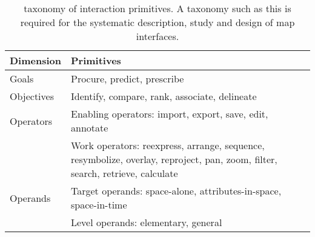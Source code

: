 \begin{table}[H]
	\caption{
		 taxonomy of interaction primitives.
		A taxonomy such as this is required for the systematic description, study and design
		of map interfaces.
	}
	\label{tab:interaction primitives}
	\centering
	\begin{tabular}{ | L{0.15\textwidth} | L{0.75\textwidth} | }
		\hline
		\textbf{Dimension}
		& \textbf{Primitives} \\
		\hline
		\hline
		Goals
		& Procure, predict, prescribe \\
		\hline
		Objectives
		& Identify, compare, rank, associate, delineate \\
		\hline
		Operators
		& \tabitem Enabling operators: import, export, save, edit, annotate \\
		& \tabitem Work operators: reexpress, arrange, sequence, resymbolize,
		overlay, reproject, pan, zoom, filter, search, retrieve, calculate \\
		\hline
		Operands
		& \tabitem Target operands: space-alone, attributes-in-space, space-in-time \\
		& \tabitem Level operands: elementary, general \\
		\hline
	\end{tabular}
\end{table}
